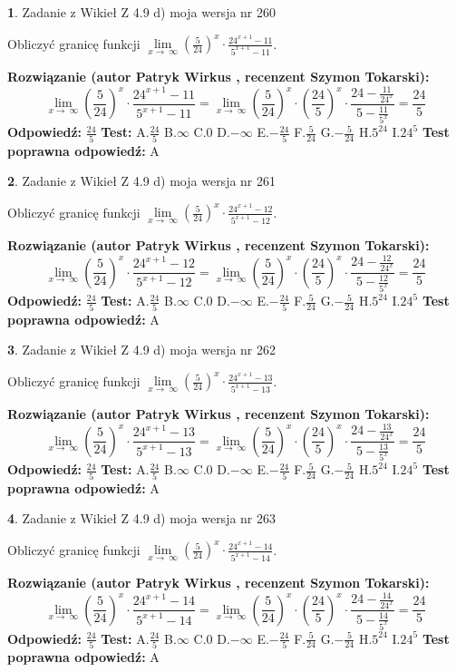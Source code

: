 \documentclass[12pt, a4paper]{article}
\theoremstyle{definition} %
\newtheorem{zad}{}
\newcommand{\zadStart}[1]{\begin{zad}#1\newline}
\newcommand{\zadStop}{\end{zad}}
\newcommand{\rozwStart}[2]{\noindent \textbf{Rozwiązanie (autor #1 , recenzent #2): }\newline}
\newcommand{\rozwStop}{\newline}
\newcommand{\odpStart}{\noindent \textbf{Odpowiedź:}\newline}
\newcommand{\odpStop}{\newline}
\newcommand{\testStart}{\noindent \textbf{Test:}\newline}
\newcommand{\testStop}{\newline}
\newcommand{\kluczStart}{\noindent \textbf{Test poprawna odpowiedź:}\newline}
\newcommand{\kluczStop}{\newline}
\begin{document}
\zadStart{Zadanie z Wikieł Z 4.9 d) moja wersja nr 260}


Obliczyć granicę funkcji  $\lim\limits_{x\to\ \infty}(\frac{5}{24})^{x}\cdot\frac{24^{x+1}-11}{5^{x+1}-11}$.
\zadStop
\rozwStart{Patryk Wirkus}{Szymon Tokarski}
$$\lim\limits_{x\to\ \infty}(\frac{5}{24})^{x}\cdot\frac{24^{x+1}-11}{5^{x+1}-11}=\lim\limits_{x\to\ \infty}(\frac{5}{24})^{x}\cdot(\frac{24}{5})^{x} \cdot \frac{24-\frac{11}{24^{x}}}{5-\frac{11}{5^{x}}} = \frac{24}{5}$$
\rozwStop
\odpStart
$\frac{24}{5}$
\odpStop
\testStart
A.$\frac{24}{5}$ B.$\infty$ C.$0$ D.$-\infty$ E.$-\frac{24}{5}$
F.$\frac{5}{24}$ G.$-\frac{5}{24}$
H.$5^{24}$
I.$24^{5}$
\testStop
\kluczStart
A
\kluczStop



\zadStart{Zadanie z Wikieł Z 4.9 d) moja wersja nr 261}


Obliczyć granicę funkcji  $\lim\limits_{x\to\ \infty}(\frac{5}{24})^{x}\cdot\frac{24^{x+1}-12}{5^{x+1}-12}$.
\zadStop
\rozwStart{Patryk Wirkus}{Szymon Tokarski}
$$\lim\limits_{x\to\ \infty}(\frac{5}{24})^{x}\cdot\frac{24^{x+1}-12}{5^{x+1}-12}=\lim\limits_{x\to\ \infty}(\frac{5}{24})^{x}\cdot(\frac{24}{5})^{x} \cdot \frac{24-\frac{12}{24^{x}}}{5-\frac{12}{5^{x}}} = \frac{24}{5}$$
\rozwStop
\odpStart
$\frac{24}{5}$
\odpStop
\testStart
A.$\frac{24}{5}$ B.$\infty$ C.$0$ D.$-\infty$ E.$-\frac{24}{5}$
F.$\frac{5}{24}$ G.$-\frac{5}{24}$
H.$5^{24}$
I.$24^{5}$
\testStop
\kluczStart
A
\kluczStop



\zadStart{Zadanie z Wikieł Z 4.9 d) moja wersja nr 262}


Obliczyć granicę funkcji  $\lim\limits_{x\to\ \infty}(\frac{5}{24})^{x}\cdot\frac{24^{x+1}-13}{5^{x+1}-13}$.
\zadStop
\rozwStart{Patryk Wirkus}{Szymon Tokarski}
$$\lim\limits_{x\to\ \infty}(\frac{5}{24})^{x}\cdot\frac{24^{x+1}-13}{5^{x+1}-13}=\lim\limits_{x\to\ \infty}(\frac{5}{24})^{x}\cdot(\frac{24}{5})^{x} \cdot \frac{24-\frac{13}{24^{x}}}{5-\frac{13}{5^{x}}} = \frac{24}{5}$$
\rozwStop
\odpStart
$\frac{24}{5}$
\odpStop
\testStart
A.$\frac{24}{5}$ B.$\infty$ C.$0$ D.$-\infty$ E.$-\frac{24}{5}$
F.$\frac{5}{24}$ G.$-\frac{5}{24}$
H.$5^{24}$
I.$24^{5}$
\testStop
\kluczStart
A
\kluczStop



\zadStart{Zadanie z Wikieł Z 4.9 d) moja wersja nr 263}


Obliczyć granicę funkcji  $\lim\limits_{x\to\ \infty}(\frac{5}{24})^{x}\cdot\frac{24^{x+1}-14}{5^{x+1}-14}$.
\zadStop
\rozwStart{Patryk Wirkus}{Szymon Tokarski}
$$\lim\limits_{x\to\ \infty}(\frac{5}{24})^{x}\cdot\frac{24^{x+1}-14}{5^{x+1}-14}=\lim\limits_{x\to\ \infty}(\frac{5}{24})^{x}\cdot(\frac{24}{5})^{x} \cdot \frac{24-\frac{14}{24^{x}}}{5-\frac{14}{5^{x}}} = \frac{24}{5}$$
\rozwStop
\odpStart
$\frac{24}{5}$
\odpStop
\testStart
A.$\frac{24}{5}$ B.$\infty$ C.$0$ D.$-\infty$ E.$-\frac{24}{5}$
F.$\frac{5}{24}$ G.$-\frac{5}{24}$
H.$5^{24}$
I.$24^{5}$
\testStop
\kluczStart
A
\kluczStop
\end{document}
